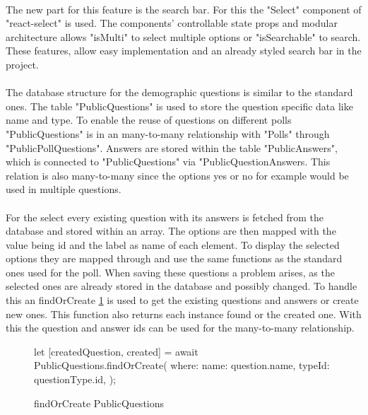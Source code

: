 \documentclass[a4paper,12pt]{report}
\begin{document}
\paragraph{}
The new part for this feature is the search bar. For this the "Select" component of "react-select" is used. The components' controllable state props and modular architecture allows  "isMulti" to select multiple options or "isSearchable" to search. These features, allow easy implementation and an already styled search bar in the project. \parencite{reactselect}
\paragraph{}
The database structure for the demographic questions is similar to the standard ones. The table "PublicQuestions" is used to store the question specific data like name and type. To enable the reuse of questions on different polls "PublicQuestions" is in an many-to-many relationship with "Polls" through "PublicPollQuestions". Answers are stored within the table "PublicAnswers", which is connected to "PublicQuestions" via "PublicQuestionAnswers. This relation is also many-to-many since the options yes or no for example would be used in multiple questions. 
\paragraph{}
For the select every existing question with its answers is fetched from the database and stored within an array. The options are then mapped with the value being id and the label as name of each element. To display the selected options they are mapped through and use the same functions as the standard ones used for the poll. When saving these questions a problem arises, as the selected ones are already stored in the database and possibly changed. To handle this an findOrCreate \ref{fig:publicQuestions} is used to get the existing questions and answers or create new ones. This function also returns each instance found or the created one. With this the question and answer ids can be used for the many-to-many relationship. \parencite{sequelizedoku} 
\begin{figure}[h!]
\begin{code}
let [createdQuestion, created] = await PublicQuestions.findOrCreate({
	where: {
		name: question.name,
		typeId: questionType.id,
	}
});
\end{code}
	\caption{findOrCreate PublicQuestions}
	\label{fig:publicQuestions}
\end{figure}
\end{document}
